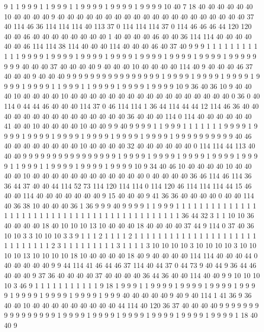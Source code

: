 9 1 1 9 9 9 1 1 9 9 9 1 1 9 9 9 9 1 9 9
9 9 1 9 9 9 9 10 40 7 18 40 40 40 40 40 40 10 40 40
40 40 9 40 40 40 40 40 40 40 40 40 40 40 40 40 40 40 40 40
40 40 40 37 40 114 46 36 114 114 114 40 113 37 0 114 114 114 37 0
114 46 46 46 44 120 120 40 40 46 40 40 40 40 40 40 40 40 1 40
40 40 40 46 40 40 36 114 114 40 40 40 40 40 40 46 114 114 38 114
40 40 40 114 40 40 40 46 40 37 40 9 9 9 1 1 1 1 1 1
1 1 1 1 1 1 9 9 9 9 1 9 9 9 9 1 9 9 9 9
1 9 9 9 9 1 9 9 9 9 1 9 9 9 9 1 9 9 9 9
1 9 9 9 9 9 9 9 9 40 40 40 37 40 40 40 40 9 40 40
40 10 40 40 40 40 114 40 9 40 40 40 46 37 40 40 40 9 40 40
40 9 9 9 9 9 9 9 9 9 9 9 9 9 9 9 9 1 9 9
9 9 1 9 9 9 9 1 9 9 9 9 1 9 9 9 9 1 9 9
9 9 1 1 9 9 9 1 1 9 9 9 9 1 9 9 9 9 1 9
9 9 9 10 9 36 40 36 10 9 40 40 40 10 40 40 40 40 10 40
40 40 40 40 40 40 40 40 40 40 40 40 40 40 40 40 0 36 0 40
114 0 44 44 46 40 40 40 114 37 0 46 114 114 1 36 44 114 44 44
12 114 46 36 40 40 40 40 40 40 40 40 40 40 40 40 40 40 40 36
40 40 40 114 0 114 40 40 40 40 40 40 41 40 40 10 40 40 40 40
10 40 40 9 9 40 9 9 9 9 1 1 9 9 9 1 1 1 1 1
1 1 9 9 9 9 1 9 9 9 9 1 9 9 9 9 1 9 9 9
9 1 9 9 9 9 1 9 9 9 9 1 9 9 9 9 1 9 9 9
9 9 9 9 9 9 9 40 46 40 40 40 40 40 40 40 40 10 40 40
40 40 32 40 40 40 40 40 40 0 114 114 44 113 40 40 40 9 9 9
9 9 9 9 9 9 9 9 9 9 9 9 9 1 9 9 9 9 1 9
9 9 9 1 9 9 9 9 1 9 9 9 9 1 9 9 9 9 1 1
9 9 9 1 1 9 9 9 9 1 9 9 9 9 1 9 9 9 9 10
9 34 40 46 10 40 40 40 40 10 40 40 40 40 10 40 40 40 40 40
40 40 40 40 40 40 40 0 40 40 40 40 36 46 114 46 114 36 36 44
37 40 40 44 114 52 73 114 120 114 114 0 114 120 46 114 114 114 44 15
46 40 40 114 40 40 40 40 40 40 40 9 15 40 40 40 9 41 36 36
40 40 40 40 0 40 40 114 40 36 38 10 40 40 40 36 1 36 9 9
9 40 9 9 9 9 1 1 9 9 9 1 1 1 1 1 1 1 1 1
1 1 1 1 1 1 1 1 1 1 1 1 1 1 1 1 1 1 1 1
1 1 1 1 1 1 1 1 1 1 1 1 1 1 1 36 44 32 3 1
1 10 10 36 40 40 40 40 18 40 10 10 10 13 10 40 40 40 18 40
40 40 40 37 44 9 114 0 37 40 36 10 10 3 3 10 10 10 3 3
9 1 1 1 2 1 1 1 1 2 1 1 1 1 1 1 1 1 1 1
1 1 1 1 1 1 1 1 1 1 1 1 1 1 1 1 1 1 1 2
3 1 1 1 1 1 1 1 1 1 3 1 1 1 1 3 10 10 10 10
3 10 10 10 10 3 10 10 10 10 13 10 10 10 10 18 10 40 40 40
40 18 40 9 40 40 40 40 114 114 40 40 40 44 0 40 40 40 40 40
9 9 44 114 41 46 44 46 37 114 40 44 37 0 44 73 9 40 44 9
36 44 46 40 40 40 9 37 36 40 40 40 40 37 40 40 40 40 36 44
36 40 40 114 40 40 9 9 10 10 10 10 3 46 9 1 1 1 1 1
1 1 1 1 1 1 9 18 1 9 9 9 1 1 9 9 9 9 1 9
9 9 9 1 9 9 9 9 1 9 9 9 9 1 9 9 9 9 1 9
9 9 9 1 9 9 9 9 1 9 9 9 40 40 40 40 40 9 40 9
40 114 1 41 36 9 36 40 40 10 40 40 40 40 40 40 40 40 40 44
114 40 120 36 37 40 40 40 40 9 9 9 9 9 9 9 9 9 9 9
9 9 9 9 9 1 9 9 9 9 1 9 9 9 9 1 9 9 9 9
1 9 9 9 9 1 9 9 9 9 1 9 9 9 9 1 18 40 40 9
